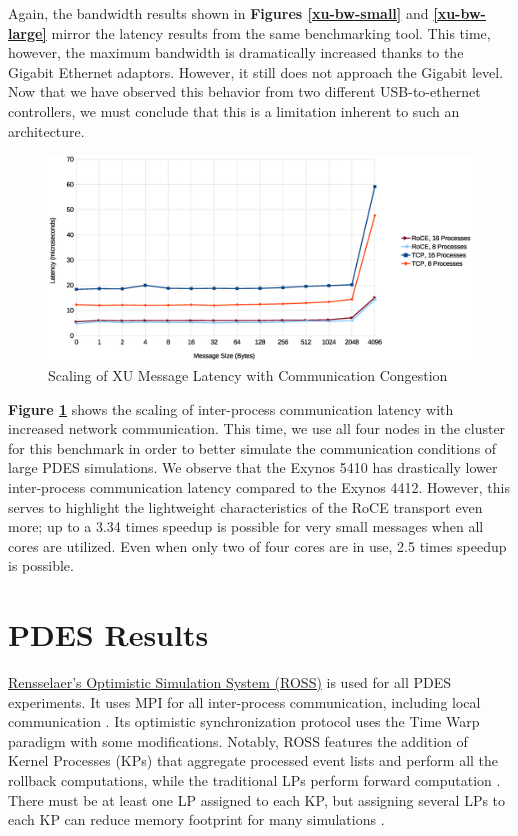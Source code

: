 \documentclass[11pt]{book}
\begin{document}
Again, the bandwidth results shown in \textbf{Figures \ref{xu-bw-small}} and
\textbf{\ref{xu-bw-large}} mirror the latency results from the same benchmarking
tool. This time, however, the maximum bandwidth is dramatically increased thanks
to the Gigabit Ethernet adaptors. However, it still does not approach the
Gigabit level. Now that we have observed this behavior from two different
USB-to-ethernet controllers, we must conclude that this is a limitation inherent
to such an architecture.

\begin{figure}[h]
\includegraphics[width=\textwidth]{xu_imb}
\caption{Scaling of XU Message Latency with Communication Congestion}
\label{xu-imb-low}
\end{figure}

\textbf{Figure \ref{xu-imb-low}} shows the scaling of inter-process
communication latency with increased network communication. This time, we use
all four nodes in the cluster for this benchmark in order to better simulate the
communication conditions of large PDES simulations. We observe that the Exynos
5410 has drastically lower inter-process communication latency compared to the
Exynos 4412. However, this serves to highlight the lightweight characteristics
of the RoCE transport even more; up to a 3.34 times speedup is possible for very
small messages when all cores are utilized. Even when only two of four cores are
in use, 2.5 times speedup is possible.

\section{\textbf{PDES Results}}
\label{pdes-results}

\href{https://github.com/carothersc/ROSS}{Rensselaer's Optimistic Simulation
  System (ROSS)} is used for all PDES experiments. It uses MPI for all
inter-process communication, including local communication
\cite{carothers-02}. Its optimistic synchronization protocol uses the Time Warp
paradigm with some modifications. Notably, ROSS features the addition of Kernel
Processes (KPs) that aggregate processed event lists and perform all the
rollback computations, while the traditional LPs perform forward computation
\cite{carothers-02}. There must be at least one LP assigned to each KP, but
assigning several LPs to each KP can reduce memory footprint for many
simulations \cite{carothers-02}.
\end{document}
